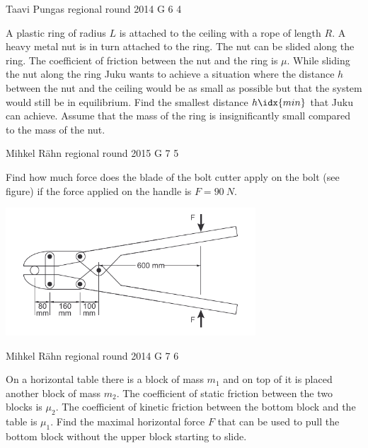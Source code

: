 \documentclass[11pt]{article}
\begin{document}
{Taavi Pungas} %
{regional round} %
{2014} %
{G 6} %
{4} %
{

\ifEngStatement
A plastic ring of radius $L$ is attached to the ceiling with a rope of length $R$. A heavy metal nut is in turn attached to the ring. The nut can be slided along the ring. The coefficient of friction between the nut and the ring is $\mu$. While sliding the nut along the ring Juku wants to achieve a situation where the distance $h$ between the nut and the ceiling would be as small as possible but that the system would still be in equilibrium. Find the smallest distance $h\idx{min}$ that Juku can achieve. Assume that the mass of the ring is insignificantly small compared to the mass of the nut.
\fi
}

{Mihkel Rähn} %
{regional round} %
{2015} %
{G 7} %
{5} %
{

\ifEngStatement
Find how much force does the blade of the bolt cutter apply on the bolt (see figure) if the force applied on the handle is $F = \SI{90}{N}$.
\begin{center}
    \includegraphics[width=0.7\textwidth]{2015-v2g-07-poldiloikur}
  \end{center}
\fi
}

{Mihkel Rähn} %
{regional round} %
{2014} %
{G 7} %
{6} %
{

\ifEngStatement
On a horizontal table there is a block of mass $m_1$ and on top of it is placed another block of mass $m_2$. The coefficient of static friction between the two blocks is $\mu_2$. The coefficient of kinetic friction between the bottom block and the table is $\mu_1$. Find the maximal horizontal force $F$ that can be used to pull the bottom block without the upper block starting to slide.
\fi
}
\end{document}
